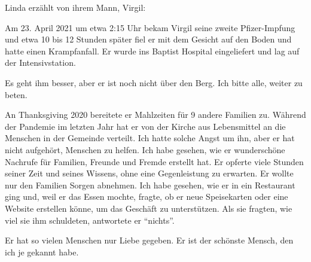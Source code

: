 Linda erzählt von ihrem Mann, Virgil:

Am 23. April 2021 um etwa 2:15 Uhr bekam Virgil seine zweite Pfizer-Impfung und
etwa 10 bis 12 Stunden später fiel er mit dem Gesicht auf den Boden und hatte
einen Krampfanfall. Er wurde ins Baptist Hospital eingeliefert und lag auf der
Intensivstation.

Es geht ihm besser, aber er ist noch nicht über den Berg. Ich bitte alle, weiter
zu beten.

An Thanksgiving 2020 bereitete er Mahlzeiten für 9 andere Familien zu. Während
der Pandemie im letzten Jahr hat er von der Kirche aus Lebensmittel an die
Menschen in der Gemeinde verteilt. Ich hatte solche Angst um ihn, aber er hat
nicht aufgehört, Menschen zu helfen. Ich habe gesehen, wie er wunderschöne
Nachrufe für Familien, Freunde und Fremde erstellt hat. Er opferte viele Stunden
seiner Zeit und seines Wissens, ohne eine Gegenleistung zu erwarten. Er wollte
nur den Familien Sorgen abnehmen. Ich habe gesehen, wie er in ein Restaurant
ging und, weil er das Essen mochte, fragte, ob er neue Speisekarten oder eine
Website erstellen könne, um das Geschäft zu unterstützen. Als sie fragten, wie
viel sie ihm schuldeten, antwortete er ``nichts''.

Er hat so vielen Menschen nur Liebe gegeben. Er ist der schönste Mensch, den ich
je gekannt habe.
